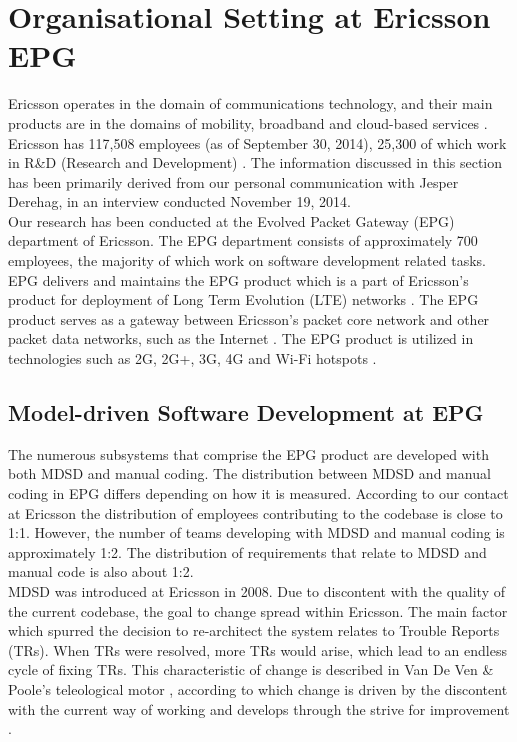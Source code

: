 \documentclass[final_report_innit.tex]{subfiles}
\begin{document}
\section{Organisational Setting at Ericsson EPG}
Ericsson operates in the domain of communications technology, and their main products are in the domains of mobility, broadband and cloud-based services \cite{etc}\cite{ecf}. Ericsson has 117,508 employees (as of September 30, 2014), 25,300 of which work in R\&D (Research and Development) \cite{etc}. The information discussed in this section has been primarily derived from our personal communication with Jesper Derehag, in an interview conducted November 19, 2014. 
\\

Our research has been conducted at the Evolved Packet Gateway (EPG) department of Ericsson. The EPG department consists of approximately 700 employees, the majority of which work on software development related tasks. EPG delivers and maintains the EPG product which is a part of Ericsson’s product for deployment of Long Term Evolution (LTE) networks \cite{eepg}. The EPG product serves as a gateway between Ericsson’s packet core network and other packet data networks, such as the Internet \cite{eepg}. The EPG product is utilized in technologies such as 2G, 2G+, 3G, 4G and Wi-Fi hotspots \cite{eepg}.

\subsection*{Model-driven Software Development at EPG}
The numerous subsystems that comprise the EPG product are developed with both MDSD and manual coding. The distribution between MDSD and manual coding in EPG differs depending on how it is measured. According to our contact at Ericsson the distribution of employees contributing to the codebase is close to 1:1. However, the number of teams developing with MDSD and manual coding is approximately 1:2. The distribution of requirements that relate to MDSD and manual code is also about 1:2.
\\

MDSD was introduced at Ericsson in 2008. Due to discontent with the quality of the current codebase, the goal to change spread within Ericsson. The main factor which spurred the decision to re-architect the system relates to Trouble Reports (TRs). When TRs were resolved, more TRs would arise, which lead to an endless cycle of fixing TRs. This characteristic of change is described in Van De Ven \& Poole’s teleological motor \cite{van1995explaining}, according to which change is driven by the discontent with the current way of working and develops through the strive for improvement \cite{van1995explaining}. 
\\
\end{document}
